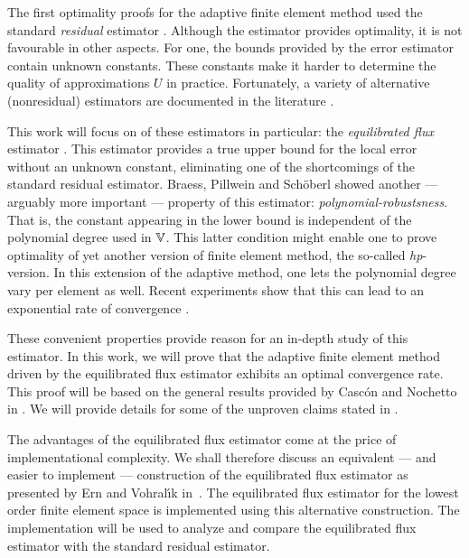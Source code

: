\documentclass[thesis.tex]{subfiles}
\begin{document}
The first optimality proofs for the adaptive finite element method used the standard \emph{residual} estimator \cite{binev, stevenson2007optimality,cascon2008}. Although
the estimator provides optimality, it is not favourable in other aspects. For one, the bounds provided
by the error estimator contain unknown constants. These constants make it harder to determine the quality of 
approximations $U$ in practice.  Fortunately, a variety of alternative (nonresidual) estimators are documented in the literature
\cite{verfurth2013posteriori}.

This work will focus on of these estimators in particular:
the \emph{equilibrated flux} estimator \cite{braessequil, braessequilrobust, ernequil}. This estimator provides a true upper bound
for the local error without an unknown constant, eliminating one of the shortcomings of the standard residual estimator. 
Braess, Pillwein and Sch\"oberl \cite{braessequilrobust} showed another --- arguably more important --- property of this estimator: \emph{polynomial-robustsness}. That is,
the constant appearing in the lower bound is independent of the polynomial degree used in $\mathbb{V}$.
This latter condition might enable one to prove optimality of yet another version of finite element method, the so-called
\emph{hp}-version. In this extension of the adaptive method, one lets the polynomial degree vary per element as well.
Recent experiments show that this can lead to an exponential rate of convergence \cite{dolejvsi2015hp}.

These convenient properties provide reason for an in-depth study of this estimator.
In this work, we will prove that the adaptive finite element method driven by the equilibrated flux estimator 
exhibits an optimal convergence rate. This proof will be based on the general results provided by Casc\'on and Nochetto 
in \cite{cascon2012}. We will provide details for some of the unproven claims stated in \cite{cascon2012}.

The advantages of the equilibrated flux estimator come at the price of implementational
complexity. We shall therefore discuss an equivalent --- and easier to implement --- construction of the equilibrated flux estimator
as presented by Ern and Vohral{\'\i}k in~\cite{ernequil}. The equilibrated flux estimator
for the lowest order finite element space is implemented using this alternative construction. The implementation
will be used to analyze and compare the equilibrated flux estimator with the standard residual estimator.

\end{document}
